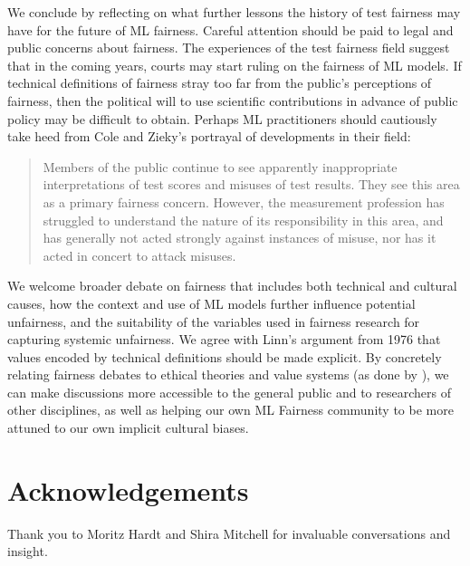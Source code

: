 \documentclass[sigconf,letterpaper,9pt]{acmart}
\begin{document}
We conclude by reflecting on what further lessons the history of test fairness may
have for the future of ML fairness. Careful attention should be paid
to legal and public concerns about fairness. The experiences of the test
fairness field suggest that in the coming years, courts may start ruling
on the fairness of ML models. If technical definitions of fairness
stray too far from the public's perceptions of fairness, then the political will
to use scientific contributions in advance of public policy may be difficult
to obtain.  Perhaps ML practitioners should cautiously take heed from
Cole and Zieky's \cite{cole2001new} portrayal of developments in their field:
\begin{quote}
\fontsize{8.5}{10}\selectfont
    Members of the public continue to see apparently inappropriate interpretations of test scores and misuses of test results. They see this area as a primary fairness concern. However, the measurement profession has struggled to understand the nature of its responsibility in this area, and has generally not acted strongly against
    instances of misuse, nor has it acted in concert to attack misuses.
\end{quote}


We welcome broader debate on fairness that includes both technical and cultural causes, how the context and use of ML models further influence potential unfairness, and the suitability of the variables used in fairness research for capturing systemic unfairness. 
We agree with Linn's
\cite{linn1976insearch} argument from 1976 that values encoded by technical definitions 
should be made explicit.
By concretely relating fairness debates to ethical theories
and value systems (as done by \cite{hunter1976critical,zwick2016philosophical}), we can make discussions 
more accessible to the general public and 
to researchers of other disciplines, as well as 
helping our own ML Fairness community to be more attuned to our own implicit cultural biases. 

\section{Acknowledgements}

Thank you to Moritz Hardt and Shira Mitchell for invaluable conversations and insight.




 
\end{document}
